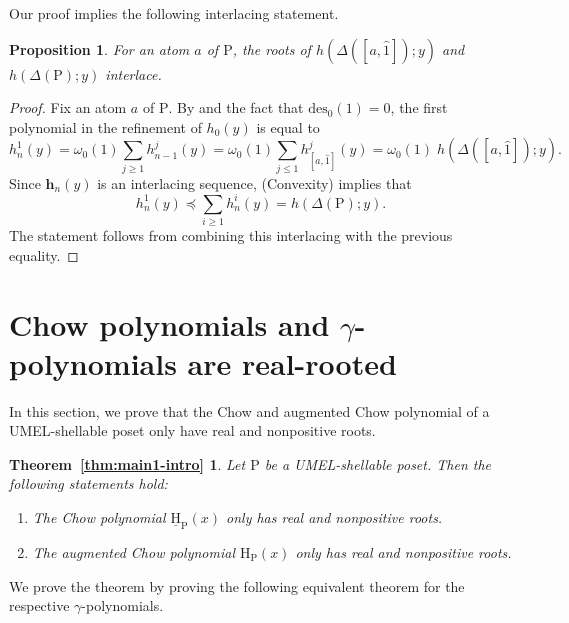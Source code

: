 \documentclass[11pt,a4paper]{amsart}
\theoremstyle{results}
\newtheorem{proposition}[thm]{Proposition}
\theoremstyle{definitions}
\def\P{\mathbb{P}}
\newcommand{\uH}{\underline{\mathrm{H}}}
\newcommand{\des}{\mathrm{des}}
\newcommand{\un}{\hat{1}}
\renewcommand{\P}{\mathrm{P}}
\renewcommand{\H}{\mathrm{H}}
\renewcommand{\hat}{\widehat}
\begin{document}
Our proof implies the following interlacing statement. 
\begin{proposition}
    For an atom $a$ of $\P$, the roots of $h(\Delta([a, \un]); y)$ and $h(\Delta(\P); y)$ interlace. 
\end{proposition}

\begin{proof}
    Fix an atom $a$ of $\P$. 
    By  and the fact that $\des_0(1) = 0$, 
    the first polynomial in the refinement of $h_{0}(y)$ is equal to
    \[
    h_{n}^{1}(y) = \omega_{0}(1) \sum_{j \geqslant 1} h_{n-1}^{j}(y) = \omega_0(1) \sum_{j \leqslant 1} h_{[a, \un]}^j(y) = \omega_0(1) \; h(\Delta([a, \un]); y). 
    \]
    Since $\mathbf{h}_{n}(y)$ is an interlacing sequence,  (Convexity) implies that 
    \[
    h_{n}^{1}(y) \preceq \sum_{i \geqslant 1} h_{n}^{i}(y) = h(\Delta(\P); y). 
    \]
    The statement follows from combining this interlacing with the previous equality. 
\end{proof}

\section{Chow polynomials and \texorpdfstring{$\gamma$}{gamma}-polynomials are real-rooted}
\label{sec:chow-RR}
In this section, we prove that the Chow and augmented Chow polynomial of a UMEL-shellable poset only have real and nonpositive roots.

\newtheorem*{thm:intro1}{Theorem~\ref{thm:main1-intro}}
\begin{thm:intro1}
    {\itshape
    Let $\P$ be a UMEL-shellable poset.
    Then the following statements hold:
    \begin{enumerate}[\normalfont (i)]
        \item The Chow polynomial $\uH_{\P}(x)$ only has real and nonpositive roots. 
        \item The augmented Chow polynomial $\H_{\P}(x)$ only has real and nonpositive roots.
    \end{enumerate}}
\end{thm:intro1}

We prove the theorem by proving the following equivalent theorem for the respective $\gamma$-polynomials. 
\end{document}
